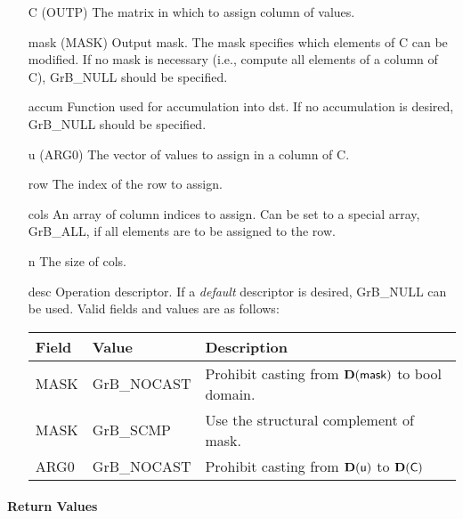 \begin{itemize}[leftmargin=1.1in]
    \item[{\sf C}]   ({\sf OUTP}) The matrix in which to assign column of values.

    \item[{\sf mask}] ({\sf MASK}) Output mask. The mask specifies which elements
    of {\sf C} can be modified. If no mask is necessary (i.e., compute all
    elements of a column of {\sf C}), {\sf GrB\_NULL} should be specified.

    \item[{\sf accum}] Function used for accumulation into {\sf dst}.  If no accumulation
                        is desired, {\sf GrB\_NULL} should be specified.

    \item[{\sf u}]   ({\sf ARG0}) The vector of values to assign in a column of {\sf C}.

    \item[{\sf row}]     The index of the row to assign.
    \item[{\sf cols}]    An array of column indices to assign. Can
                              be set to a special array, {\sf GrB\_ALL}, if all elements
                              are to be assigned to the row.
    \item[{\sf n}]       The size of {\sf cols}.

    \item[{\sf desc}]   Operation descriptor. If a
    \emph{default} descriptor is desired, {\sf GrB\_NULL} can be
    used. Valid fields and values are as follows: \\
    \begin{tabular}{lll}
    Field  & Value & Description \\
    \hline
    {\sf MASK} & {\sf GrB\_NOCAST} & Prohibit casting from $\bold{D}({\sf mask})$ to {\sf bool} domain. \\
    {\sf MASK} & {\sf GrB\_SCMP} & Use the structural complement of {\sf mask}. \\
    {\sf ARG0} & {\sf GrB\_NOCAST} & Prohibit casting from $\bold{D}({\sf u})$ to $\bold{D}({\sf C})$ \\
    \end{tabular}

\end{itemize}

\paragraph{Return Values}

